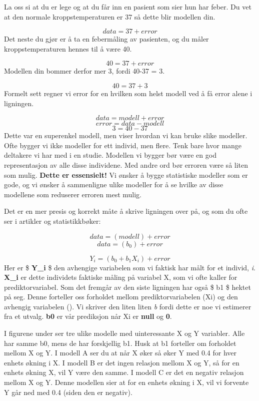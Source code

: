 \documentclass[
]{book}
\begin{document}
La oss si at du er lege og at du får inn en pasient som sier hun har feber. Du vet at den normale kroppstemperaturen er 37 så dette blir modellen din.

\[
data = 37 + error
\]
Det neste du gjør er å ta en febermåling av pasienten, og du måler kroppstemperaturen hennes til å være 40.

\[
40 = 37 + error
\]
Modellen din bommer derfor mer 3, fordi 40-37 = 3.

\[
40 = 37 + 3
\]
Formelt sett regner vi error for en hvilken som helst modell ved å få error alene i ligningen.

\[
data = modell + error
\]
\[
error = data - modell
\]
\[
3 = 40 - 37
\]
Dette var en superenkel modell, men viser hvordan vi kan bruke slike modeller. Ofte bygger vi ikke modeller for ett individ, men flere. Tenk bare hvor mange deltakere vi har med i en studie. Modellen vi bygger bør være en god representasjon av alle disse individene. Med andre ord bør erroren være så liten som mulig. \textbf{Dette er essensielt!} Vi ønsker å bygge statistiske modeller som er gode, og vi ønsker å sammenligne ulike modeller for å se hvilke av disse modellene som reduserer erroren mest mulig.

Det er en mer presis og korrekt måte å skrive ligningen over på, og som du ofte ser i artikler og statistikkbøker:

\[
data = (modell) + error
\]
\[
data = (b_0) + error
\]

\[
Y_i = (b_0 + b_1X_i) + error
\]
Her er \$ \textbf{Y\_i} \$ den avhengige variabelen som vi faktisk har målt for et individ, \emph{i}. \textbf{X\_i} er dette individets faktiske måling på variabel X, som vi ofte kaller for prediktorvariabel. Som det fremgår av den siste ligningen har også \$ b1 \$ hektet på seg. Denne forteller oss forholdet mellom prediktorvariabelen (Xi) og den avhengig variabelen (). Vi skriver den liten liten \emph{b} fordi dette er noe vi estimerer fra et utvalg. \textbf{b0} er vår prediksjon når Xi er \textbf{null} og \textbf{0}.

I figurene under ser tre ulike modelle med uinteressante X og Y variabler. Alle har samme b0, mens de har forskjellig b1. Husk at b1 forteller om forholdet mellom X og Y. I modell A ser du at når X øker så øker Y med 0.4 for hver enhets økning i X. I modell B er det ingen relasjon mellom X og Y, så for en enhets økning X, vil Y være den samme. I modell C er det en negativ relasjon mellom X og Y. Denne modellen sier at for en enhets økning i X, vil vi forvente Y går ned med 0.4 (siden den er negativ).
\end{document}
